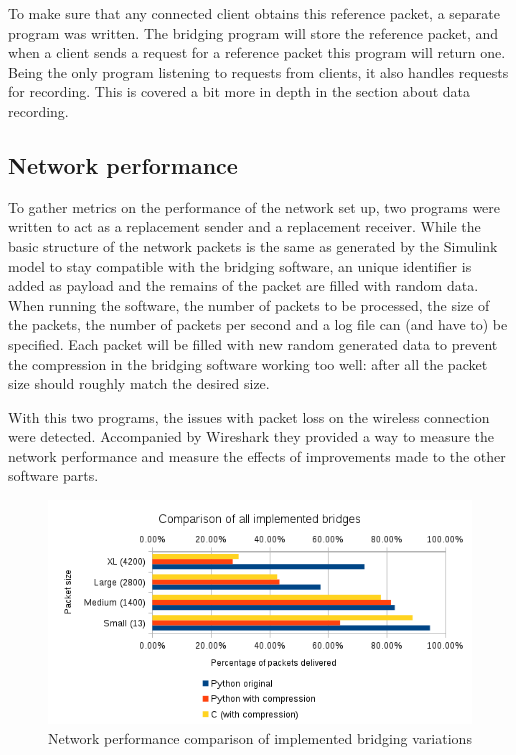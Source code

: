 To make sure that any connected client obtains this reference packet, a separate program was written. The bridging program will store the reference packet, and when a client sends a request for a reference packet this program will return one. Being the only program listening to requests from clients, it also handles requests for recording. This is covered a bit more in depth in the section about data recording.

\subsection{Network performance}

To gather metrics on the performance of the network set up, two programs were written to act as a replacement sender and a replacement receiver. While the basic structure of the network packets is the same as generated by the Simulink model to stay compatible with the bridging software, an unique identifier is added as payload and the remains of the packet are filled with random data. When running the software, the number of packets to be processed, the size of the packets, the number of packets per second and a log file can (and have to) be specified. Each packet will be filled with new random generated data to prevent the compression in the bridging software working too well: after all the packet size should roughly match the desired size.

With this two programs, the issues with packet loss on the wireless connection were detected. Accompanied by Wireshark they provided a way to measure the network performance and measure the effects of improvements made to the other software parts.

\begin{figure}[H]
	\centering
	\includegraphics[width=\linewidth]{images/overview.png}
	\caption{Network performance comparison of implemented bridging variations}
	\label{fig:networkperformance}
\end{figure}

